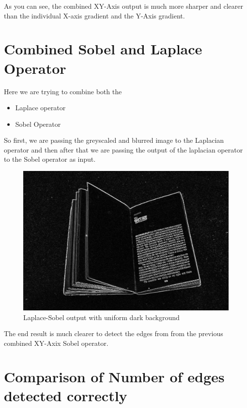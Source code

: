 \documentclass[BTech]{srmuthesis}
\begin{document}
As you can see, the combined XY-Axis output is much more sharper and clearer than the individual X-axis gradient and the Y-Axis gradient.

\section{Combined Sobel and Laplace Operator}

Here we are trying to combine both the 

\begin{itemize}
    \item Laplace operator
    \item Sobel Operator
\end{itemize}

So first, we are passing the greyscaled and blurred image to the Laplacian operator and then after that we are passing the output of the laplacian operator to the Sobel operator as input. 

\begin{figure}[h!]
    \centering
    \includegraphics[width=15cm\textwidth]{sobel-out}
    \caption{Laplace-Sobel output with uniform dark background}
    \label{fig:Laplace & Sobel output with uniform dark background}
\end{figure}

The end result is much clearer to detect the edges from from the previous combined XY-Axix Sobel operator.

\section{Comparison of Number of edges detected correctly}
\end{document}
